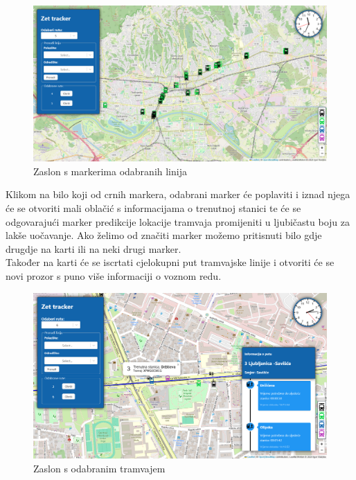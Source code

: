 \documentclass[zavrsnirad]{fer}
\begin{document}
\begin{figure}[H]
	\centering
	\includegraphics[width=\linewidth]{Figures/odabrantram.png} 
	\caption{Zaslon s markerima odabranih linija}
	\label{slk:zaslonmark}
\end{figure}
Klikom na bilo koji od crnih markera, odabrani marker će poplaviti i iznad njega će se otvoriti mali oblačić s informacijama o trenutnoj stanici te će se odgovarajući marker predikcije lokacije tramvaja promijeniti u ljubičastu boju za lakše uočavanje. Ako želimo od značiti marker možemo pritisnuti bilo gdje drugdje na karti ili na neki drugi marker.\\
Također na karti će se iscrtati cjelokupni put tramvajske linije i otvoriti će se novi prozor s puno više informaciji o voznom redu.
\begin{figure}[H]
	\centering
	\includegraphics[width=\linewidth]{Figures/tram1.png} 
	\caption{Zaslon s odabranim tramvajem}
	\label{slk:tramodabran}
\end{figure}
\end{document}
